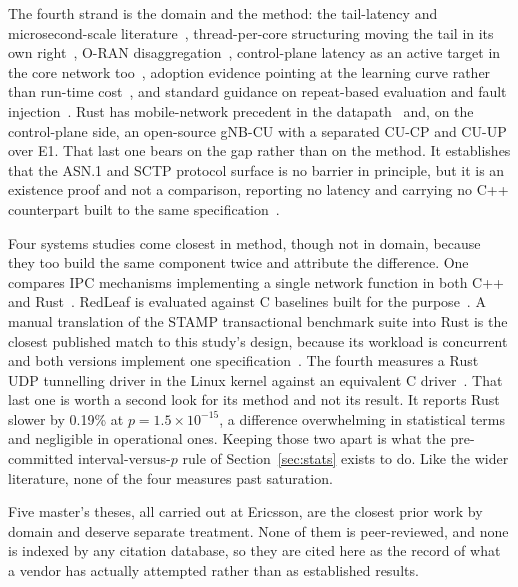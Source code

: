 \documentclass[english,oneside,a4paper,censored,csm,software-track-2020]{HYthesisML}
\begin{document}
The fourth strand is the domain and the method: the tail-latency and microsecond-scale
literature~\cite{dean2013tail,barroso2017microseconds,li2014tales,huang2017predictability},
thread-per-core structuring moving the tail in its own right~\cite{enberg2019threadpercore}, O-RAN
disaggregation~\cite{polese2023oran}, control-plane latency as an active target in the core network
too~\cite{liu2023l25gc,park2025ctrlbench}, adoption evidence pointing at the learning curve rather
than run-time cost~\cite{fulton2021adopting,crichton2024learning,ardito2021verbosity}, and standard
guidance on repeat-based evaluation and fault
injection~\cite{georges2007rigorous,natella2016fault}. Rust has mobile-network precedent in the
datapath~\cite{qazi2017pepc} and, on the control-plane side, an open-source gNB-CU with a separated
CU-CP and CU-UP over E1. That last one bears on the gap rather than on the method. It establishes
that the ASN.1 and SCTP protocol surface is no barrier in principle, but it is an existence proof
and not a comparison, reporting no latency and carrying no C++ counterpart built to the same
specification~\cite{alsoran}.

Four systems studies come closest in method, though not in domain, because they too build the
same component twice and attribute the difference. One compares IPC mechanisms implementing a
single network function in both C++ and Rust~\cite{li2021ipc}. RedLeaf is evaluated against C
baselines built for the purpose~\cite{narayanan2020redleaf}. A manual translation of the STAMP
transactional benchmark suite into Rust is the closest published match to this study's design,
because its workload is concurrent and both versions implement one
specification~\cite{suchert2023stamp}. The fourth measures a Rust UDP tunnelling driver in the
Linux kernel against an equivalent C driver~\cite{gonzalez2023rustudp}. That last one is worth a
second look for its method and not its result. It reports Rust slower by 0.19\% at
$p = 1.5 \times 10^{-15}$, a difference overwhelming in statistical terms and negligible in
operational ones. Keeping those two apart is what the pre-committed interval-versus-$p$ rule of
Section~\ref{sec:stats} exists to do. Like the wider literature, none of the four measures past
saturation.

Five master's theses, all carried out at Ericsson, are the closest prior work by domain and
deserve separate treatment. None of them is peer-reviewed, and none is indexed by any citation
database, so they are cited here as the record of what a vendor has actually attempted rather
than as established results.
\end{document}
